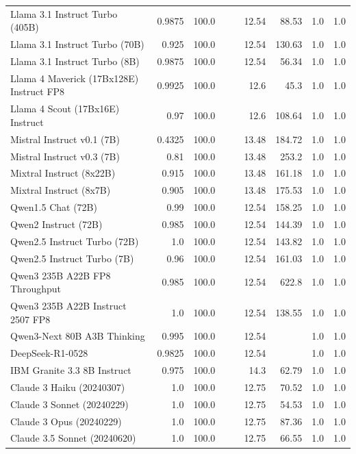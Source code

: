 \begin{table}[htp]
{\begin{tabular}{lrrrrrrrr}
Llama 3.1 Instruct Turbo (405B) & 0.9875 & 100.0 &  &  & 12.54 & 88.53 & 1.0 & 1.0 \\
Llama 3.1 Instruct Turbo (70B) & 0.925 & 100.0 &  &  & 12.54 & 130.63 & 1.0 & 1.0 \\
Llama 3.1 Instruct Turbo (8B) & 0.9875 & 100.0 &  &  & 12.54 & 56.34 & 1.0 & 1.0 \\
Llama 4 Maverick (17Bx128E) Instruct FP8 & 0.9925 & 100.0 &  &  & 12.6 & 45.3 & 1.0 & 1.0 \\
Llama 4 Scout (17Bx16E) Instruct & 0.97 & 100.0 &  &  & 12.6 & 108.64 & 1.0 & 1.0 \\
Mistral Instruct v0.1 (7B) & 0.4325 & 100.0 &  &  & 13.48 & 184.72 & 1.0 & 1.0 \\
Mistral Instruct v0.3 (7B) & 0.81 & 100.0 &  &  & 13.48 & 253.2 & 1.0 & 1.0 \\
Mixtral Instruct (8x22B) & 0.915 & 100.0 &  &  & 13.48 & 161.18 & 1.0 & 1.0 \\
Mixtral Instruct (8x7B) & 0.905 & 100.0 &  &  & 13.48 & 175.53 & 1.0 & 1.0 \\
Qwen1.5 Chat (72B) & 0.99 & 100.0 &  &  & 12.54 & 158.25 & 1.0 & 1.0 \\
Qwen2 Instruct (72B) & 0.985 & 100.0 &  &  & 12.54 & 144.39 & 1.0 & 1.0 \\
Qwen2.5 Instruct Turbo (72B) & 1.0 & 100.0 &  &  & 12.54 & 143.82 & 1.0 & 1.0 \\
Qwen2.5 Instruct Turbo (7B) & 0.96 & 100.0 &  &  & 12.54 & 161.03 & 1.0 & 1.0 \\
Qwen3 235B A22B FP8 Throughput & 0.985 & 100.0 &  &  & 12.54 & 622.8 & 1.0 & 1.0 \\
Qwen3 235B A22B Instruct 2507 FP8 & 1.0 & 100.0 &  &  & 12.54 & 138.55 & 1.0 & 1.0 \\
Qwen3-Next 80B A3B Thinking & 0.995 & 100.0 &  &  & 12.54 &  & 1.0 & 1.0 \\
DeepSeek-R1-0528 & 0.9825 & 100.0 &  &  & 12.54 &  & 1.0 & 1.0 \\
IBM Granite 3.3 8B Instruct & 0.975 & 100.0 &  &  & 14.3 & 62.79 & 1.0 & 1.0 \\
Claude 3 Haiku (20240307) & 1.0 & 100.0 &  &  & 12.75 & 70.52 & 1.0 & 1.0 \\
Claude 3 Sonnet (20240229) & 1.0 & 100.0 &  &  & 12.75 & 54.53 & 1.0 & 1.0 \\
Claude 3 Opus (20240229) & 1.0 & 100.0 &  &  & 12.75 & 87.36 & 1.0 & 1.0 \\
Claude 3.5 Sonnet (20240620) & 1.0 & 100.0 &  &  & 12.75 & 66.55 & 1.0 & 1.0 \\

\end{tabular}}
\end{table}
